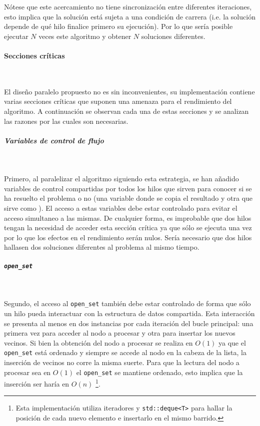 \begin{notebox}
    Nótese que este acercamiento no tiene sincronización entre diferentes iteraciones,
    esto implica que la solución está sujeta a una condición de carrera
    (i.e. la solución depende de qué hilo finalice primero su ejecución).
    Por lo que sería posible ejecutar $N$ veces este algoritmo y obtener
    $N$ soluciones diferentes.
\end{notebox}

\paragraph{Secciones críticas}~

El diseño paralelo propuesto no es sin inconvenientes,
su implementación contiene varias secciones críticas que suponen
una amenaza para el rendimiento del algoritmo.
A continuación se observan cada una de estas secciones y se
analizan las razones por las cuales son necesarias.

\subparagraph{Variables de control de flujo}~

Primero, al paralelizar el algoritmo siguiendo esta estrategia,
se han añadido variables de control compartidas por todos
los hilos que sirven para conocer si se ha resuelto el problema
o no (una variable donde se copia el resultado y
otra que sirve como ).
El acceso a estas variables debe estar controlado
para evitar el acceso simultaneo a las mismas.
De cualquier forma, es improbable que dos hilos tengan
la necesidad de acceder esta sección crítica ya que sólo
se ejecuta una vez por lo que los efectos en el rendimiento serán nulos.
Sería necesario que dos hilos hallasen dos soluciones diferentes al
problema al mismo tiempo.

\subparagraph{\lstinline{open_set}}~

Segundo, el acceso al \lstinline{open_set} también 
debe estar controlado de forma que sólo un hilo
pueda interactuar con la estructura de datos compartida.
Esta interacción se presenta al menos en dos instancias por
cada iteración del bucle principal:
una primera vez para acceder al nodo a procesar
y otra para insertar los nuevos vecinos.
Si bien la obtención del nodo a procesar se realiza en $O(1)$
ya que el \lstinline{open_set} está ordenado y
siempre se accede al nodo en la cabeza de la lista,
la inserción de vecinos no corre la misma suerte.
Para que la lectura del nodo a procesar sea en $O(1)$
el \lstinline{open_set} se mantiene ordenado,
esto implica que la inserción ser haría en $O(n)$
\footnote{Esta implementación utiliza iteradores y
\lstinline{std::deque<T>} para hallar la posición de cada
nuevo elemento e insertarlo en el mismo barrido.}.

